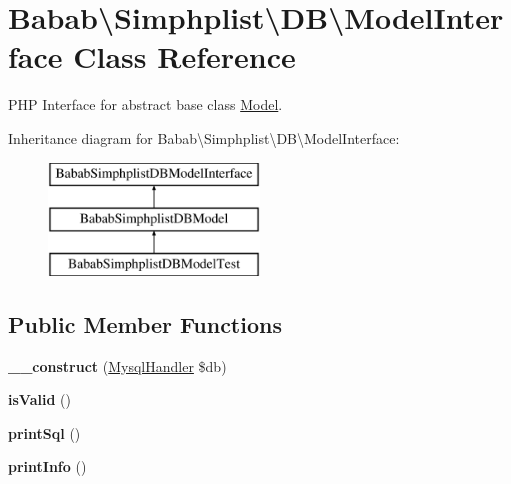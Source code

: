 \hypertarget{interfaceBabab_1_1Simphplist_1_1DB_1_1ModelInterface}{\section{Babab\textbackslash{}Simphplist\textbackslash{}D\+B\textbackslash{}Model\+Interface Class Reference}
\label{interfaceBabab_1_1Simphplist_1_1DB_1_1ModelInterface}
}


P\+H\+P Interface for abstract base class \hyperlink{classBabab_1_1Simphplist_1_1DB_1_1Model}{Model}.  


Inheritance diagram for Babab\textbackslash{}Simphplist\textbackslash{}D\+B\textbackslash{}Model\+Interface\+:\begin{figure}[H]
\begin{center}
\leavevmode
\includegraphics[height=3.000000cm]{interfaceBabab_1_1Simphplist_1_1DB_1_1ModelInterface}
\end{center}
\end{figure}
\subsection*{Public Member Functions}
\begin{DoxyCompactItemize}
\item 
\hypertarget{interfaceBabab_1_1Simphplist_1_1DB_1_1ModelInterface_a54775ae8d7e293b4ec842e6212db46e3}{{\bfseries \+\_\+\+\_\+construct} (\hyperlink{classBabab_1_1Simphplist_1_1DB_1_1MysqlHandler}{Mysql\+Handler} \$db)}\label{interfaceBabab_1_1Simphplist_1_1DB_1_1ModelInterface_a54775ae8d7e293b4ec842e6212db46e3}

\item 
\hypertarget{interfaceBabab_1_1Simphplist_1_1DB_1_1ModelInterface_a0d553ffa3355ceb92e013d686a9b17dc}{{\bfseries is\+Valid} ()}\label{interfaceBabab_1_1Simphplist_1_1DB_1_1ModelInterface_a0d553ffa3355ceb92e013d686a9b17dc}

\item 
\hypertarget{interfaceBabab_1_1Simphplist_1_1DB_1_1ModelInterface_aef40b6c9c160ee49de1eaa907fc8a8bb}{{\bfseries print\+Sql} ()}\label{interfaceBabab_1_1Simphplist_1_1DB_1_1ModelInterface_aef40b6c9c160ee49de1eaa907fc8a8bb}

\item 
\hypertarget{interfaceBabab_1_1Simphplist_1_1DB_1_1ModelInterface_a431764cc7cccba0688a7a969caa03dfb}{{\bfseries print\+Info} ()}\label{interfaceBabab_1_1Simphplist_1_1DB_1_1ModelInterface_a431764cc7cccba0688a7a969caa03dfb}

\end{DoxyCompactItemize}


